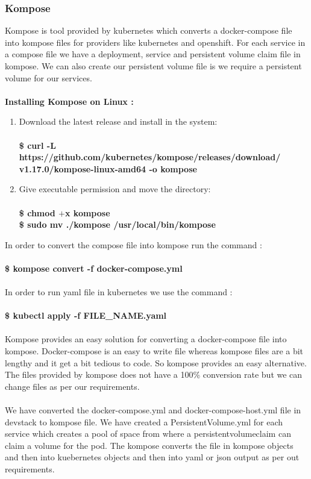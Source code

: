 \documentclass[12pt]{article}
\begin{document}
\subsubsection{Kompose}
Kompose is tool provided by kubernetes which converts a docker-compose file into kompose files for providers like kubernetes and openshift. For each service in a compose file we have a deployment, service and persistent volume claim file in kompose. We can also create our persistent volume file is we require a persistent volume for our services.\\\\
\textbf{Installing Kompose on Linux :}
\begin{enumerate}
	\item Download the latest release and install in the system:\\\\
	\textbf{\$ curl -L https://github.com/kubernetes/kompose/releases/download/\\v1.17.0/kompose-linux-amd64 -o kompose}
	\item Give executable permission and move the directory:\\\\
	\textbf{\$ chmod $+$x kompose\\
		\$ sudo mv ./kompose /usr/local/bin/kompose}
\end{enumerate}
In order to convert the compose file into kompose run the command :\\\\
\textbf{\$ kompose convert -f docker-compose.yml}\\\\
In order to run yaml file in kubernetes we use the command :\\\\
\textbf{\$ kubectl apply -f FILE\_NAME.yaml}\\\\
Kompose provides an easy solution for  converting a docker-compose file into kompose. Docker-compose is an easy to write file whereas kompose files are a bit lengthy and it get a bit tedious to code. So kompose provides an easy alternative. The files provided by kompose does not have a 100\% conversion rate but we can change files as per our requirements.\\\\
We have converted the docker-compose.yml and docker-compose-host.yml file in devstack to kompose file. We have created a PersistentVolume.yml for each service which creates a pool of space from where a persistentvolumeclaim can claim a volume for the pod. The kompose converts the file in kompose objects and then into kuebernetes objects and then into yaml or json output as per out requirements.
\end{document}
